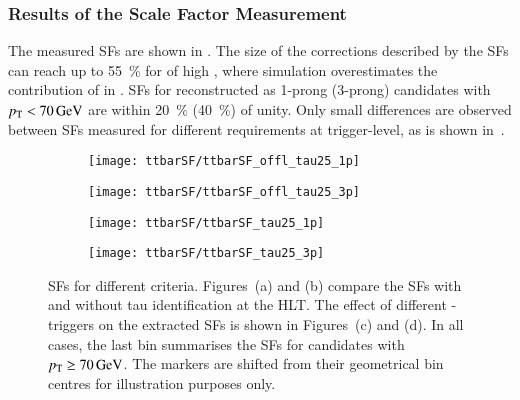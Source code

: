 \subsubsection{Results of the Scale Factor Measurement}

The measured \faketauhadvis SFs are shown in .
The size of the corrections described by the SFs can reach up to
\SI{55}{\percent} for \faketauhadvis of high \pT, where simulation overestimates
the contribution of \faketauhadvis in \ttbar. SFs for \faketauhadvis
reconstructed as 1-prong (3-prong) candidates with $\pT < \SI{70}{\GeV}$ are
within \SI{20}{\percent} (\SI{40}{\percent}) of unity. Only small differences
are observed between SFs measured for different \tauid requirements at
trigger-level, as is shown
in~.

\begin{figure}[htbp]
  \centering

  \begin{subfigure}[t]{.495\textwidth}
    \texttt{[image: ttbarSF/ttbarSF\_offl\_tau25\_1p]}
    \subcaption{}
    \label{fig:ttbarSF_postfit_SF_a}
  \end{subfigure}\hfill%
  \begin{subfigure}[t]{.495\textwidth}
    \texttt{[image: ttbarSF/ttbarSF\_offl\_tau25\_3p]}
    \subcaption{}
    \label{fig:ttbarSF_postfit_SF_b}
  \end{subfigure}

  \begin{subfigure}[t]{.495\textwidth}
    \texttt{[image: ttbarSF/ttbarSF\_tau25\_1p]}
    \subcaption{}
    \label{fig:ttbarSF_postfit_SF_c}
  \end{subfigure}\hfill%
  \begin{subfigure}[t]{.495\textwidth}
    \texttt{[image: ttbarSF/ttbarSF\_tau25\_3p]}
    \subcaption{}
    \label{fig:ttbarSF_postfit_SF_d}
  \end{subfigure}

  \caption[\Faketauhadvis SFs for different \tauid criteria.]{\Faketauhadvis SFs
    for different \tauid criteria. Figures~(a) and (b) compare the SFs with and
    without tau identification at the HLT. The effect of different
    \tauhadvis-triggers on the extracted SFs is shown in Figures~(c) and (d). In
    all cases, the last bin summarises the SFs for \tauhadvis candidates with
    $\pT \geq \SI{70}{\GeV}$. The markers are shifted from their geometrical bin
    centres for illustration purposes only.}%
  \label{fig:ttbarSF_postfit_SF}
\end{figure}

